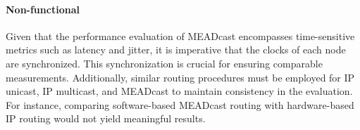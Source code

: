 \paragraph{Non-functional} %
\label{par:Non-functional}
Given that the performance evaluation of MEADcast encompasses time-sensitive
    metrics such as latency and jitter, it is imperative that the clocks of
    each node are synchronized.
This synchronization is crucial for ensuring comparable measurements.
Additionally, similar routing procedures must be employed for IP unicast, IP
    multicast, and MEADcast to maintain consistency in the evaluation.
For instance, comparing software-based MEADcast routing with hardware-based IP
    routing would not yield meaningful results.



